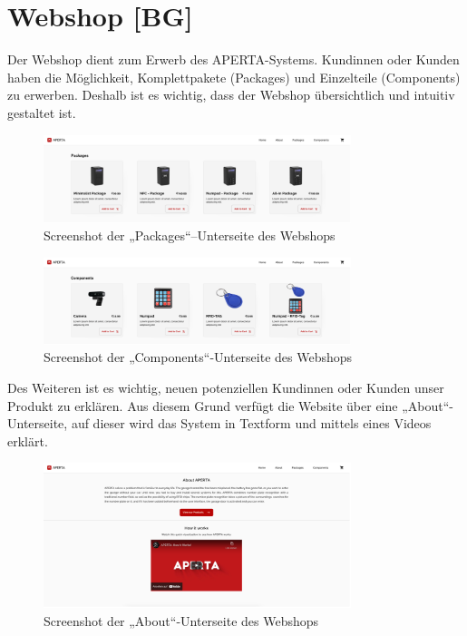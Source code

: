 \section{Webshop [BG]}
Der Webshop dient zum Erwerb des APERTA-Systems. Kundinnen oder Kunden haben die Möglichkeit, Komplettpakete (Packages) und Einzelteile (Components) zu erwerben. Deshalb ist es wichtig, dass der Webshop übersichtlich und intuitiv gestaltet ist.


\begin{figure}[H]
  \centering
  \includegraphics[width=0.8\textwidth]{pics/aperta-packages.png}
  \caption{Screenshot der „Packages“–Unterseite des Webshops}
\end{figure}

\begin{figure}[H]
    \centering
    \includegraphics[width=0.8\textwidth]{pics/aperta-components.png}
    \caption{Screenshot der „Components“-Unterseite des Webshops}
\end{figure}

Des Weiteren ist es wichtig, neuen potenziellen Kundinnen oder Kunden unser Produkt zu erklären. Aus diesem Grund verfügt die Website über eine „About“-Unterseite, auf dieser wird das System in Textform und mittels eines Videos erklärt.

\begin{figure}[H]
    \centering
    \includegraphics[width=0.8\textwidth]{pics/aperta-about.png}
    \caption{Screenshot der „About“-Unterseite des Webshops}
\end{figure}

